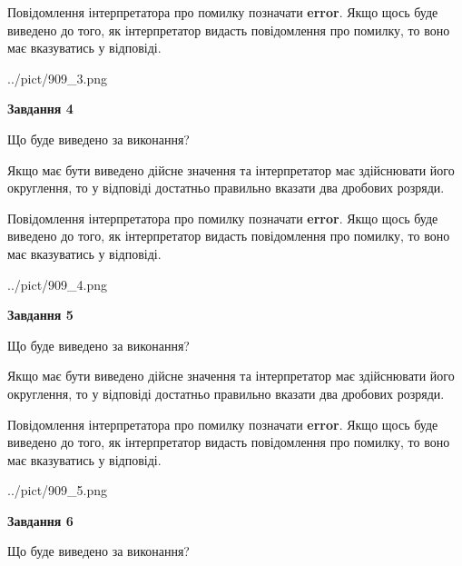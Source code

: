 \documentclass[12pt, ukrainian]{article}
\begin{document}
{\begin {Large}
Повідомлення інтерпретатора про помилку позначати \textbf{error}.
Якщо щось буде виведено до того, як інтерпретатор видасть повідомлення про помилку, 
то воно має вказуватись у відповіді. \par

\begin{center}
	{../pict/909_3.png}
\end{center}
\newpage

{\begin {center}\textbf{Завдання 4}\end {center}}\par
Що буде виведено за виконання? \par

Якщо має бути виведено дійсне значення та інтерпретатор має здійснювати його округлення, 
то у відповіді достатньо правильно вказати два дробових розряди.

Повідомлення інтерпретатора про помилку позначати \textbf{error}.
Якщо щось буде виведено до того, як інтерпретатор видасть повідомлення про помилку, 
то воно має вказуватись у відповіді. \par

\begin{center}
	{../pict/909_4.png}
\end{center}
\newpage

{\begin {center}\textbf{Завдання 5}\end {center}}\par
Що буде виведено за виконання? \par

Якщо має бути виведено дійсне значення та інтерпретатор має здійснювати його округлення, 
то у відповіді достатньо правильно вказати два дробових розряди.

Повідомлення інтерпретатора про помилку позначати \textbf{error}.
Якщо щось буде виведено до того, як інтерпретатор видасть повідомлення про помилку, 
то воно має вказуватись у відповіді. \par

\begin{center}
	{../pict/909_5.png}
\end{center}
\newpage

{\begin {center}\textbf{Завдання 6}\end {center}}\par
Що буде виведено за виконання? \par


\end{Large}}
\end{document}

